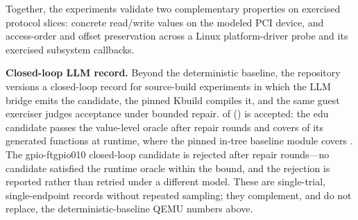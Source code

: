 Together, the experiments validate two complementary properties on exercised
protocol slices: concrete read/write values on the modeled PCI device, and
access-order and offset preservation across a Linux platform-driver probe and
its exercised subsystem callbacks.

\textbf{Closed-loop LLM record.} Beyond the deterministic baseline, the
repository versions a closed-loop record for \ClosedLoopCases{}
source-build experiments in which the LLM bridge emits the candidate, the
pinned Kbuild compiles it, and the same guest exerciser judges acceptance
under bounded repair. \ClosedLoopAccepted{} of \ClosedLoopCases{}
(\ClosedLoopAcceptedNames{}) is accepted: the edu candidate passes the
value-level oracle after \EduRepairRounds{} repair rounds and covers
\EduCandidateFnCov{} of its generated functions at runtime, where the pinned
in-tree baseline module covers \EduBaselineFnCov{}. The gpio-ftgpio010
closed-loop candidate is rejected after \FtRepairRounds{} repair rounds---no
candidate satisfied the runtime oracle within the bound, and the rejection is
reported rather than retried under a different model. These are single-trial,
single-endpoint records without repeated sampling; they complement, and do
not replace, the deterministic-baseline QEMU numbers above.

